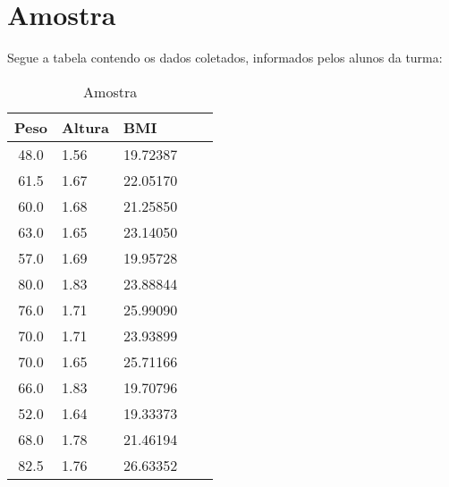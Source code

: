 \documentclass[12pt, a4paper]{article}
\begin{document}
	\section{Amostra}
		Segue a tabela contendo os dados coletados, informados pelos alunos da turma:
		\begin{table}[h]
			\centering
			\begin{tabular}{|cll|c|c|}
				\hline
				\rule[-1.0ex]{0pt}{4.0ex}
				\textbf{Peso}&\textbf{Altura}&\textbf{BMI}\\ \hline
				\rule[-1.0ex]{0pt}{4.0ex}
				48.0   &	1.56	&	19.72387 \\ \hline
				\rule[-1.0ex]{0pt}{4.0ex}
				61.5   &	1.67	&	22.05170 \\ \hline
				\rule[-1.0ex]{0pt}{4.0ex}
				60.0   & 	1.68	&	21.25850 \\ \hline
				\rule[-1.0ex]{0pt}{4.0ex}
				63.0   &	1.65	&	23.14050 \\ \hline
				\rule[-1.0ex]{0pt}{4.0ex}
				57.0   &	1.69	&	19.95728 \\ \hline
				\rule[-1.0ex]{0pt}{4.0ex}
				80.0   &	1.83	&	23.88844 \\ \hline
				\rule[-1.0ex]{0pt}{4.0ex}
				76.0   &	1.71	&	25.99090 \\ \hline
				\rule[-1.0ex]{0pt}{4.0ex}
				70.0   &	1.71	&	23.93899 \\ \hline
				\rule[-1.0ex]{0pt}{4.0ex}
				70.0   &	1.65	&	25.71166 \\ \hline
				\rule[-1.0ex]{0pt}{4.0ex}
				66.0   &	1.83	&	19.70796 \\ \hline
				\rule[-1.0ex]{0pt}{4.0ex}
				52.0   &	1.64	&	19.33373 \\ \hline
				\rule[-1.0ex]{0pt}{4.0ex}
				68.0   &	1.78	&	21.46194 \\ \hline
				\rule[-1.0ex]{0pt}{4.0ex}
				82.5   &	1.76	&	26.63352 \\ \hline
			\end{tabular}
			\caption{Amostra}
		\end{table}
		
\end{document}
